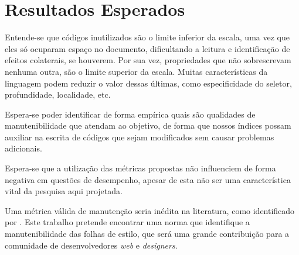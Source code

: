 %
%

\chapter{Resultados Esperados}

Entende-se que códigos inutilizados são o limite inferior da escala, uma vez que eles só ocuparam espaço no documento, dificultando a leitura e identificação de efeitos colaterais, se houverem. Por sua vez, propriedades que não sobrescrevam nenhuma outra, são o limite superior da escala. Muitas características da linguagem podem reduzir o valor dessas últimas, como especificidade do seletor, profundidade, localidade, etc.

Espera-se poder identificar de forma empírica quais são qualidades de manutenibilidade que atendam ao objetivo, de forma que nossos índices possam auxiliar na escrita de códigos que sejam modificados sem causar problemas adicionais.

Espera-se que a utilização das métricas propostas não influenciem de forma negativa em questões de desempenho, apesar de esta não ser uma característica vital da pesquisa aqui projetada.

Uma métrica válida de manutenção seria inédita na literatura, como identificado por . Este trabalho pretende encontrar uma norma que identifique a manutenibilidade das folhas de estilo, que será uma grande contribuição para a comunidade de desenvolvedores \textit{web} e \textit{designers}. 